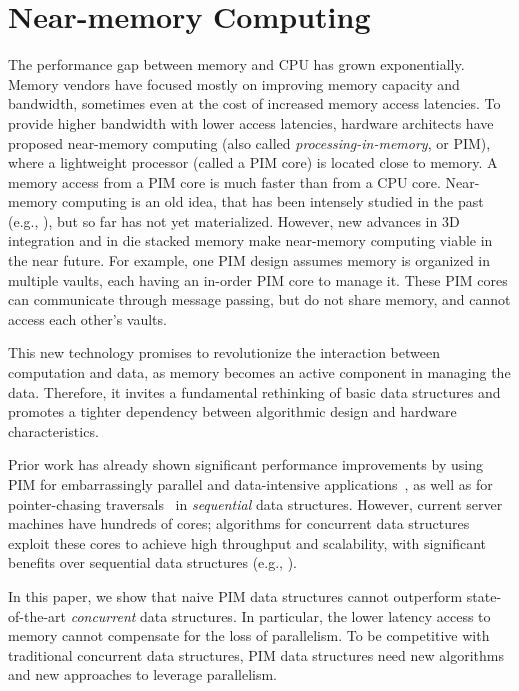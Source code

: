 \section{Near-memory Computing}

The performance gap between memory and CPU has grown exponentially. Memory vendors have focused mostly on improving memory capacity and bandwidth, sometimes even at the cost of increased memory access latencies. To provide higher bandwidth with lower access latencies, hardware architects have proposed near-memory computing (also called \textit{processing-in-memory}, or PIM), where a lightweight processor (called a PIM core) is located close to memory. A memory access from a PIM core is much faster than from a CPU core. 
Near-memory computing is an old idea, that has been intensely studied in the past 
(e.g., \cite{Stone1970, Kogge1994, Gokhale1995, Patterson1997, Oskin1998, KangHYKGLTP99, Hall1999}), 
but so far has not yet materialized. However, new advances in 3D integration and in die stacked memory make near-memory computing viable in the near future. 
For example, one PIM design assumes memory is organized in multiple vaults, each having an in-order PIM core to manage it. These PIM cores
can communicate through message passing, but do not share memory, and cannot access each other's vaults. 

This new technology promises to revolutionize the interaction between computation and data, as memory becomes an active component in managing the data. Therefore, it invites a fundamental rethinking of basic data structures and promotes a tighter dependency between algorithmic design and hardware characteristics. 

Prior work has already shown significant performance improvements by using PIM for embarrassingly parallel 
and data-intensive applications~\cite{Zhang2014:TTP, Ahn2015:2, ZhuASSHPF13, Akin2015:DRM}, 
as well as for pointer-chasing traversals~\cite{hsieh2016accelerating} in \emph{sequential} data structures. 
However, current server machines have hundreds of cores; 
algorithms for concurrent data structures exploit these cores to achieve high throughput and scalability, 
with significant benefits over sequential data structures 
(e.g., \cite{practicallf, skiplists-concpugh, valois, Herlihy08}). 

In this paper, we show that
  naive PIM data structures cannot outperform 
 state-of-the-art \emph{concurrent} data structures. In particular, 
the lower latency access to memory cannot compensate for the loss of 
parallelism. To be competitive with traditional concurrent data structures, 
PIM data structures need new algorithms and new approaches to leverage parallelism.  

